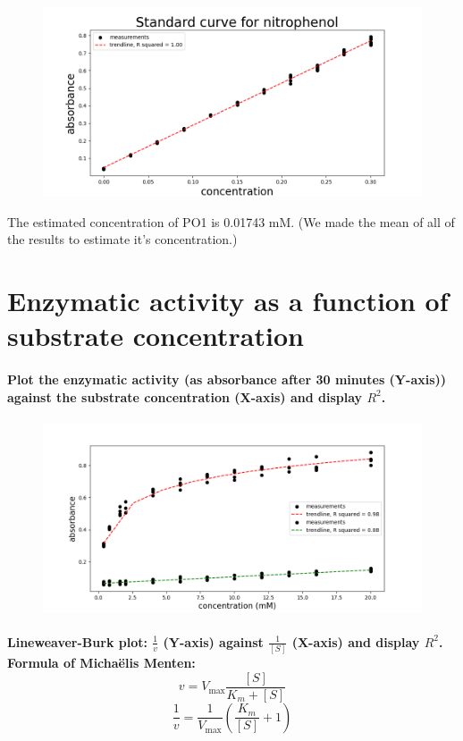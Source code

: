 \documentclass[a4paper,12pt]{article}
\begin{document}
\begin{figure}[h]
    \includegraphics[scale=0.4]{fig1.png}
    \centering
\end{figure}

The estimated concentration of PO1 is 0.01743 mM. (We made the mean of all of the results to estimate it's concentration.)

\section{Enzymatic activity as a function of substrate concentration}

\paragraph{Plot the enzymatic activity (as absorbance after 30 minutes (Y-axis)) 
against the substrate concentration (X-axis) and display $R^2$.}

\begin{figure}[h]
    \includegraphics[scale=0.4]{fig2_1.png}
    \centering
\end{figure}

\paragraph{Lineweaver-Burk plot: $\frac{1}{v}$ (Y-axis) against $\frac{1}{[S]}$ (X-axis) and display $R^2$. 
Formula of Michaëlis Menten:\[v=V_{\text{max}}\frac{[S]}{K_m+[S]}\] \[\frac{1}{v}=\frac{1}{V_{\text{max}}}\left(\frac{K_m}{[S]}+1\right)\]}
\end{document}
